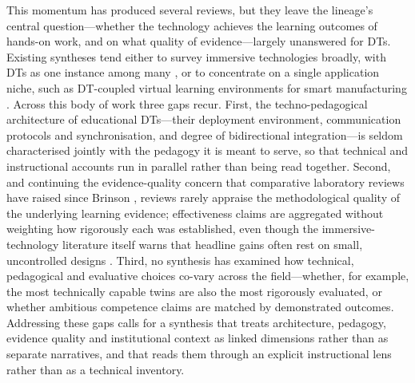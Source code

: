 This momentum has produced several reviews, but they leave the lineage's
central question---whether the technology achieves the learning outcomes of
hands-on work, and on what quality of evidence---largely unanswered for DTs.
Existing syntheses tend either to survey immersive technologies broadly,
with DTs as one instance among many \cite{lampropoulos_virtual_2025,tokhayeva_virtualisation_2026,jiang_state_2026}, or to concentrate on a single
application niche, such as DT-coupled virtual learning environments for smart
manufacturing \cite{kumar_karanam_systematic_2025}. Across this body of work three
gaps recur. First, the techno-pedagogical architecture of educational DTs---their
deployment environment, communication protocols and synchronisation, and degree
of bidirectional integration---is seldom characterised jointly with the pedagogy it
is meant to serve, so that technical and instructional accounts run in parallel
rather than being read together. Second, and continuing the evidence-quality
concern that comparative laboratory reviews have raised since Brinson
\cite{brinson_learning_2015,heradio_virtual_2016}, reviews rarely appraise the
methodological quality of the underlying learning evidence; effectiveness claims
are aggregated without weighting how rigorously each was established, even though
the immersive-technology literature itself warns that headline gains often rest
on small, uncontrolled designs \cite{fan_impacts_2025,giussani_study_2025}.
Third, no synthesis has examined how technical, pedagogical and evaluative
choices co-vary across the field---whether, for example, the most technically
capable twins are also the most rigorously evaluated, or whether ambitious
competence claims are matched by demonstrated outcomes. Addressing these gaps
calls for a synthesis that treats architecture, pedagogy, evidence quality and
institutional context as linked dimensions rather than as separate narratives,
and that reads them through an explicit instructional lens rather than as a
technical inventory.

